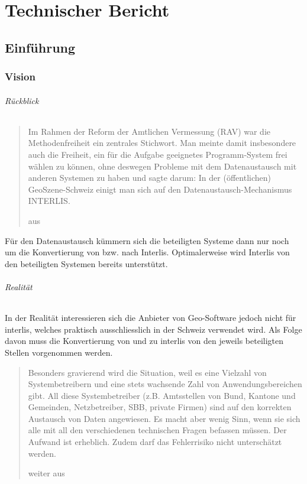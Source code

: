 \part{Technischer Bericht}\label{part:tb}
\glsresetall


\chapter{Einführung}

\section{Vision}\label{sec:tb:vision}
\paragraph{Rückblick}
\blockquote[aus \cite{rahmenvorst-interlisopen}]{Im Rahmen der Reform der Amtlichen Vermessung (RAV) war die Methodenfreiheit ein zentrales Stichwort. Man meinte damit insbesondere auch die Freiheit, ein für die Aufgabe geeignetes Programm-System frei wählen zu können, ohne deswegen Probleme mit dem Datenaustausch mit anderen Systemen zu haben und sagte darum: In der (öffentlichen) GeoSzene-Schweiz einigt man sich auf den Datenaustausch-Mechanismus INTERLIS.}

Für den Datenaustausch kümmern sich die beteiligten Systeme dann nur noch um die Konvertierung von bzw. nach Interlis. Optimalerweise wird Interlis von den beteiligten Systemen bereits unterstützt.

\paragraph{Realität}
In der Realität interessieren sich die Anbieter von Geo-Software jedoch nicht für \gls{interlis}, welches praktisch ausschliesslich in der Schweiz verwendet wird. Als Folge davon muss die Konvertierung von und zu \gls{interlis} von den jeweils beteiligten Stellen vorgenommen werden.

\blockquote[weiter aus \cite{rahmenvorst-interlisopen}]{Besonders gravierend wird die Situation, weil es eine Vielzahl von Systembetreibern und eine stets wachsende Zahl von Anwendungsbereichen gibt. All diese Systembetreiber (z.B. Amtsstellen von Bund, Kantone und Gemeinden, Netzbetreiber, SBB, private Firmen) sind auf den korrekten Austausch von Daten angewiesen. Es macht aber wenig Sinn, wenn sie sich alle mit all den verschiedenen technischen Fragen befassen müssen. Der Aufwand ist erheblich. Zudem darf das Fehlerrisiko nicht unterschätzt werden.}

